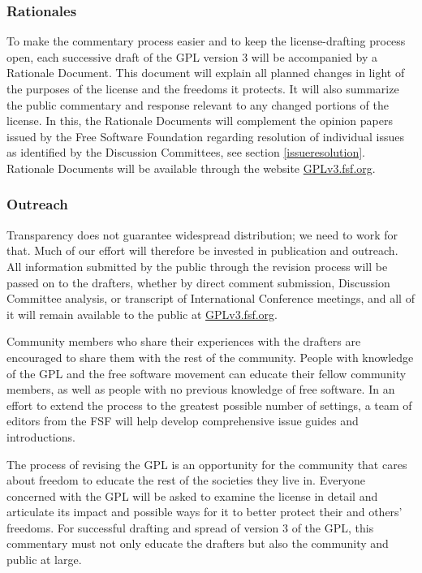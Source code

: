 \documentclass[a4paper,spanish,12pt]{book}
\begin{document}
\subsubsection{Rationales}\label{Rationales} To make the commentary process
easier and to keep the license-drafting process open, each successive
draft of the GPL version 3 will be accompanied by a Rationale
Document.  This document will explain all planned changes in light of
the purposes of the license and the freedoms it protects.  It will
also summarize the public commentary and response relevant to any
changed portions of the license.  In this, the Rationale Documents
will complement the opinion papers issued by the Free Software
Foundation regarding resolution of individual issues as identified by
the Discussion Committees, see section \ref{issueresolution}.
Rationale Documents will be available through the website
\url{GPLv3.fsf.org}.

\subsubsection{Outreach} Transparency does not guarantee widespread
distribution; we need to work for that.  Much of our effort will
therefore be invested in publication and outreach.  All information
submitted by the public through the revision process will be passed on
to the drafters, whether by direct comment submission, Discussion
Committee analysis, or transcript of International Conference
meetings, and all of it will remain available to the public at
\url{GPLv3.fsf.org}.

Community members who share their experiences with the drafters are
encouraged to share them with the rest of the community.  People with
knowledge of the GPL and the free software movement can educate their
fellow community members, as well as people with no previous knowledge
of free software.  In an effort to extend the process to the greatest
possible number of settings, a team of editors from the FSF will help
develop comprehensive issue guides and introductions.

The process of revising the GPL is an opportunity for the community
that cares about freedom to educate the rest of the societies they
live in.  Everyone concerned with the GPL will be asked to examine the
license in detail and articulate its impact and possible ways for it
to better protect their and others' freedoms.  For successful drafting
and spread of version 3 of the GPL, this commentary must not only
educate the drafters but also the community and public at large.
\end{document}
